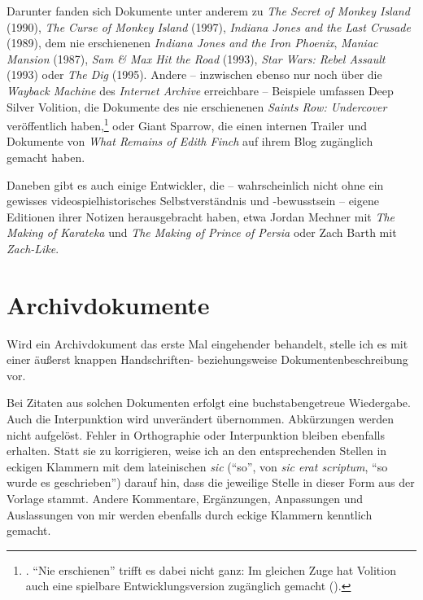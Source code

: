 \documentclass[a5paper,pagesize]{scrbook}
\begin{document}
Darunter fanden sich Dokumente unter anderem zu \textit{The Secret of Monkey Island} (1990), \textit{The Curse of Monkey Island} (1997), \textit{Indiana Jones and the Last Crusade} (1989), dem nie erschienenen \textit{Indiana Jones and the Iron Phoenix}, \textit{Maniac Mansion} (1987), \textit{Sam \& Max Hit the Road} (1993), \textit{Star Wars: Rebel Assault} (1993) oder \textit{The Dig} (1995).
Andere -- inzwischen ebenso nur noch über die \textit{Wayback Machine} des \textit{Internet Archive} erreichbare -- Beispiele umfassen Deep Silver Volition, die Dokumente des nie erschienenen \textit{Saints Row: Undercover} veröffentlich haben,\footnote{\autocite[Vgl.][]{volition_thursday_2016}. \enquote{Nie erschienen} trifft es dabei nicht ganz: Im gleichen Zuge hat Volition auch eine spielbare Entwicklungsversion zugänglich gemacht (\autocite[vgl.][]{frank_canceled_2016}).} oder Giant Sparrow, die einen internen Trailer und Dokumente von \textit{What Remains of Edith Finch} auf ihrem Blog zugänglich gemacht haben.\autocite{giant_sparrow_edith_2018}

Daneben gibt es auch einige Entwickler, die -- wahrscheinlich nicht ohne ein gewisses videospielhistorisches Selbstverständnis und -bewusstsein -- eigene Editionen ihrer Notizen herausgebracht haben, etwa Jordan Mechner mit \textit{The Making of Karateka} und \textit{The Making of Prince of Persia} oder Zach Barth mit \textit{Zach-Like}.\autocite[Vgl.][]{mechner_karateka_2012,mechner_prince_2020,barth_zach_like_2019}


\section{Archivdokumente}\label{ch:quellen_archivdokumente}
Wird ein Archivdokument das erste Mal eingehender behandelt, stelle ich es mit einer äußerst knappen Handschriften- beziehungsweise Dokumentenbeschreibung vor.

Bei Zitaten aus solchen Dokumenten erfolgt eine buchstabengetreue Wiedergabe.
Auch die Interpunktion wird unverändert übernommen.
Abkürzungen werden nicht aufgelöst.
Fehler in Orthographie oder Interpunktion bleiben ebenfalls erhalten.
Statt sie zu korrigieren, weise ich an den entsprechenden Stellen in eckigen Klammern mit dem lateinischen \textit{sic} (\enquote{so}, von \textit{sic erat scriptum}, \enquote{so wurde es geschrieben}) darauf hin, dass die jeweilige Stelle in dieser Form aus der Vorlage stammt.
Andere Kommentare, Ergänzungen, Anpassungen und Auslassungen von mir werden ebenfalls durch eckige Klammern kenntlich gemacht.
\end{document}
